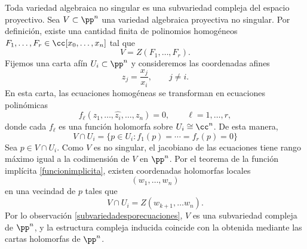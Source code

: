 	\begin{example}\label{algsonsubvariedades}
		Toda variedad algebraica no singular es una subvariedad compleja del espacio proyectivo. 
			Sea $V\subset\pp^n$ una variedad algebraica proyectiva no singular. Por definición, existe una cantidad finita de polinomios homogéneos $F_1,\dots,F_r\in \cc[x_0,\dots,x_n]$ tal que
			\begin{equation*}
				V=Z(F_1,\dots,F_r).
			\end{equation*}
			Fijemos una carta afín $U_i\subset \pp^n$
			y consideremos las coordenadas afines
			\begin{equation*}
				z_j=\frac{x_j}{x_i},\qquad j\neq i.
			\end{equation*}
			En esta carta, las ecuaciones homogéneas se transforman en ecuaciones polinómicas
			\begin{equation*}
				f_\ell(z_1,\dots,\widehat{z_i},\dots,z_n)=0,
				\qquad \ell=1,\dots,r,
			\end{equation*}
			donde cada $f_\ell$ es una función holomorfa sobre $U_i\cong \cc^n$. De esta manera,
			\begin{equation*}
				V\cap U_i=\{p\in U_i : f_1(p)=\cdots=f_r(p)=0\}
			\end{equation*}
			Sea $p\in V\cap U_i$. Como $V$ es no singular, el jacobiano de las ecuaciones tiene rango máximo igual a la codimensión de $V$ en $\pp^n$. Por el teorema de la función implícita \ref{funcionimplicita}, existen coordenadas holomorfas locales
			\begin{equation*}
				(w_1,\dots,w_n)
			\end{equation*}
			en una vecindad de $p$ tales que
			\begin{equation*}
			 V\cap U_i=Z(w_{k+1},\dots w_n).
			\end{equation*}
			Por lo observación \ref{subvariedadesporecuaciones}, $V$ es una subvariedad compleja de $\pp^n$, y la estructura compleja inducida coincide con la obtenida mediante las cartas holomorfas de $\pp^n$.
	\end{example}

